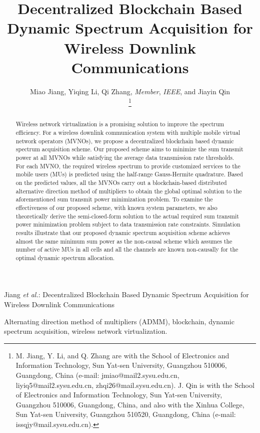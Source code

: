 \documentclass[journal]{IEEEtran}
\begin{document}
	
\title{Decentralized Blockchain Based Dynamic Spectrum Acquisition for Wireless Downlink Communications}
	
\author{Miao Jiang, Yiqing Li, Qi Zhang, \emph{Member}, \emph{IEEE}, and Jiayin Qin

\thanks{M. Jiang, Y. Li, and Q. Zhang are with the School of Electronics and Information Technology, Sun Yat-sen University, Guangzhou 510006, Guangdong, China (e-mail: jmiao@mail2.sysu.edu.cn, liyiq5@mail2.sysu.edu.cn, zhqi26@mail.sysu.edu.cn). J. Qin is with the School of Electronics and
Information Technology, Sun Yat-sen University, Guangzhou 510006, Guangdong,  China, and also with the Xinhua College, Sun Yat-sen University, Guangzhou 510520, Guangdong, China (e-mail: issqjy@mail.sysu.edu.cn).}
}%
	
	
{Jiang \MakeLowercase{\textit{et al.}}: Decentralized Blockchain Based Dynamic Spectrum Acquisition for Wireless Downlink Communications}
	
\maketitle
\begin{abstract}
Wireless network virtualization is a promising solution to improve the spectrum efficiency. For a wireless downlink communication system with multiple mobile virtual network operators (MVNOs), we propose a decentralized blockchain based dynamic spectrum acquisition scheme. Our proposed scheme aims to minimize the sum transmit power at all MVNOs while satisfying the average data transmission rate thresholds. For each MVNO,
the required wireless spectrum to provide customized services to the mobile users (MUs) is predicted using the half-range Gauss-Hermite quadrature. Based on the predicted values, all the MVNOs carry out a blockchain-based distributed alternative direction method of multipliers to obtain the global optimal solution to the aforementioned sum transmit power minimization problem. To examine the effectiveness of our proposed scheme, with known system parameters, we also theoretically derive the semi-closed-form solution to the actual required sum transmit power minimization problem subject to data transmission rate constraints. Simulation results illustrate that our proposed dynamic spectrum acquisition scheme achieves almost the same minimum sum power as the non-causal scheme which assumes the number of active MUs in all cells and all the channels are known non-causally for the optimal dynamic spectrum allocation.
\end{abstract}
\begin{IEEEkeywords} 
Alternating direction method of multipliers (ADMM), blockchain, dynamic spectrum acquisition, wireless network virtualization.
\end{IEEEkeywords}
\IEEEpeerreviewmaketitle
	
\end{document}

